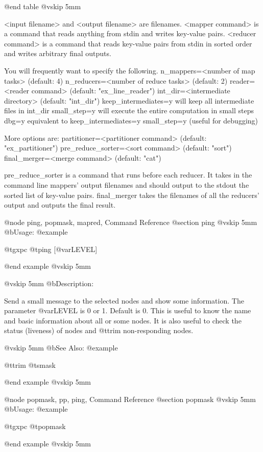 @end table
@vskip 5mm

<input filename> and <output filename> are filenames.
<mapper command> is a command that reads anything from stdin and 
writes key-value pairs.
<reducer command> is a command that reads key-value pairs from stdin 
in sorted order and writes arbitrary final outputs.

You will frequently want to specify the following.
  n_mappers=<number of map tasks>       (default: 4)
  n_reducers=<number of reduce tasks>   (default: 2)
  reader=<reader command>               (default: "ex_line_reader")
  int_dir=<intermediate directory>      (default: "int_dir")
  keep_intermediates=y  will keep all intermediate files in int_dir
  small_step=y  will execute the entire computation in small steps
  dbg=y   equivalent to keep_intermediates=y small_step=y (useful for debugging)

More options are:
  partitioner=<partitioner command>  (default: "ex_partitioner")
  pre_reduce_sorter=<sort command>   (default: "sort")
  final_merger=<merge command>       (default: "cat")

pre_reduce_sorter is a command that runs before each reducer.
It takes in the command line mappers' output filenames and should
output to the stdout the sorted list of key-value pairs.
final_merger takes the filenames of all the reducers' output and
outputs the final result.


@node ping, popmask, mapred, Command Reference
@section ping
@vskip 5mm
@b{Usage:}
@example

  @t{gxpc} @t{ping} [@var{LEVEL}]

@end example
@vskip 5mm

@vskip 5mm
@b{Description:}


  Send a small message to the selected nodes and show some
information. The parameter @var{LEVEL} is 0 or 1. Default is 0.
This is useful to know the name and basic information about
all or some nodes. It is also useful to check the status (liveness)
of nodes and @t{trim} non-responding nodes.

@vskip 5mm
@b{See Also:}
@example

  @t{trim} @t{smask}

@end example
@vskip 5mm

@node popmask, pp, ping, Command Reference
@section popmask
@vskip 5mm
@b{Usage:}
@example

  @t{gxpc} @t{popmask}

@end example
@vskip 5mm

